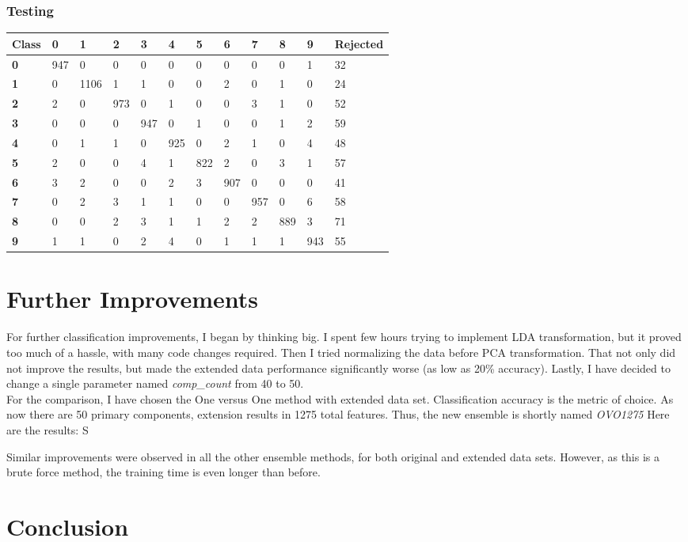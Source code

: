 \documentclass[
  a4paper,            %
  DIV=10,             %
  oneside,            %
  BCOR=5mm,           %
  parskip=half,       %
  numbers=noenddot,   %
  bibtotoc,           %
  listof=totoc,        %
  article
]{scrreprt}
\begin{document}
\subsubsection{Testing}
\begin{center}
  \begin{tabular}{|p{1cm}|p{1cm}|p{1cm}|p{1cm}|p{1cm}|p{1cm}|p{1cm}|p{1cm}|p{1cm}|p{1cm}|p{1cm}|p{1.7cm}|}
    \hline
    \textbf{Class} & \textbf{0} & \textbf{1} & \textbf{2} & \textbf{3} & \textbf{4} & \textbf{5} & \textbf{6} & \textbf{7} & \textbf{8} & \textbf{9} & \textbf{Rejected} \\
    \hline
    \textbf{0} & 947 & 0 & 0 & 0 & 0 & 0 & 0 & 0 & 0 & 1 & 32 \\
    \hline
    \textbf{1} & 0 & 1106 & 1 & 1 & 0 & 0 & 2 & 0 & 1 & 0 & 24 \\
    \hline
    \textbf{2} & 2 & 0 & 973 & 0 & 1 & 0 & 0 & 3 & 1 & 0 & 52 \\
    \hline
    \textbf{3} & 0 & 0 & 0 & 947 & 0 & 1 & 0 & 0 & 1 & 2 & 59 \\
    \hline
    \textbf{4} & 0 & 1 & 1 & 0 & 925 & 0 & 2 & 1 & 0 & 4 & 48 \\
    \hline
    \textbf{5} & 2 & 0 & 0 & 4 & 1 & 822 & 2 & 0 & 3 & 1 & 57 \\
    \hline
    \textbf{6} & 3 & 2 & 0 & 0 & 2 & 3 & 907 & 0 & 0 & 0 & 41 \\
    \hline
    \textbf{7} & 0 & 2 & 3 & 1 & 1 & 0 & 0 & 957 & 0 & 6 & 58 \\
    \hline
    \textbf{8} & 0 & 0 & 2 & 3 & 1 & 1 & 2 & 2 & 889 & 3 & 71 \\
    \hline
    \textbf{9} & 1 & 1 & 0 & 2 & 4 & 0 & 1 & 1 & 1 & 943 & 55 \\
    \hline
  \end{tabular}
\end{center}
\section{Further Improvements}
For further classification improvements, I began by thinking big.
I spent few hours trying to implement LDA transformation, but it proved too much of a hassle, with many code changes required.
Then I tried normalizing the data before PCA transformation.
That not only did not improve the results, but made the extended data performance significantly worse (as low as 20\% accuracy).
Lastly, I have decided to change a single parameter named \textit{comp\_count} from 40 to 50.
\\
For the comparison, I have chosen the One versus One method with extended data set.
Classification accuracy is the metric of choice.
As now there are 50 primary components, extension results in 1275 total features.
Thus, the new ensemble is shortly named \textit{OVO1275}
Here are the results:
S

Similar improvements were observed in all the other ensemble methods, for both original and extended data sets.
However, as this is a brute force method, the training time is even longer than before.
\section{Conclusion}
\end{document}
